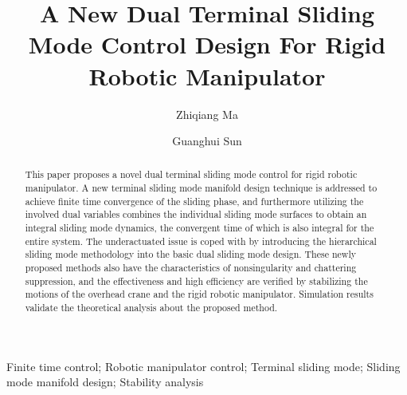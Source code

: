 \documentclass[3p]{elsarticle}
\theoremstyle{plain}
\theoremstyle{remark}
\begin{document}
\begin{frontmatter}
\title{A New Dual Terminal Sliding Mode Control Design For Rigid Robotic Manipulator}
\author{Zhiqiang Ma}
\author{Guanghui Sun}
\address{Research Institute of Intelligent Control and Systems, Harbin Institute of Technology, Harbin 150001, China}

\begin{abstract}
This paper proposes a novel dual terminal sliding mode control for rigid robotic manipulator. A new terminal sliding mode manifold design technique is addressed to achieve finite time convergence of the sliding phase, and furthermore utilizing the involved dual variables combines the individual sliding mode surfaces to obtain an integral sliding mode dynamics, the convergent time of which is also integral for the entire system. The underactuated issue is coped with by introducing the hierarchical sliding mode methodology into the basic dual sliding mode design. These newly proposed methods also have the characteristics of nonsingularity and chattering suppression, and the effectiveness and high efficiency are verified by stabilizing the motions of the overhead crane and the rigid robotic manipulator. Simulation results validate the theoretical analysis about the proposed method.
\end{abstract}
\begin{keyword}
Finite time control; Robotic manipulator control; Terminal sliding mode; Sliding mode manifold design; Stability analysis
\end{keyword}
\end{frontmatter}
\end{document}
